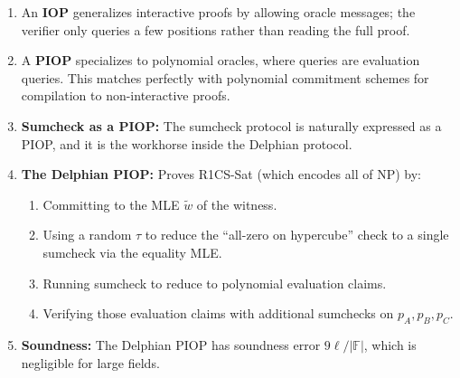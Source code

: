 \documentclass[11pt]{article}
\theoremstyle{plain}
\theoremstyle{definition}
\newcommand{\F}{\mathbb{F}}
\begin{document}
\begin{enumerate}
  \item An \textbf{IOP} generalizes interactive proofs by allowing oracle
    messages; the verifier only queries a few positions rather than reading the
    full proof.
  \item A \textbf{PIOP} specializes to polynomial oracles, where queries are
    evaluation queries. This matches perfectly with polynomial commitment schemes
    for compilation to non-interactive proofs.
  \item \textbf{Sumcheck as a PIOP:} The sumcheck protocol is naturally expressed
    as a PIOP, and it is the workhorse inside the Delphian protocol.
  \item \textbf{The Delphian PIOP:} Proves R1CS-Sat (which encodes all of NP)
    by:
    \begin{enumerate}[label=(\alph*)]
      \item Committing to the MLE $\tilde{w}$ of the witness.
      \item Using a random $\tau$ to reduce the ``all-zero on hypercube'' check
        to a single sumcheck via the equality MLE.
      \item Running sumcheck to reduce to polynomial evaluation claims.
      \item Verifying those evaluation claims with additional sumchecks on
        $p_A, p_B, p_C$.
    \end{enumerate}
  \item \textbf{Soundness:} The Delphian PIOP has soundness error
    $9\ell/|\F|$, which is negligible for large fields.
\end{enumerate}
\end{document}
